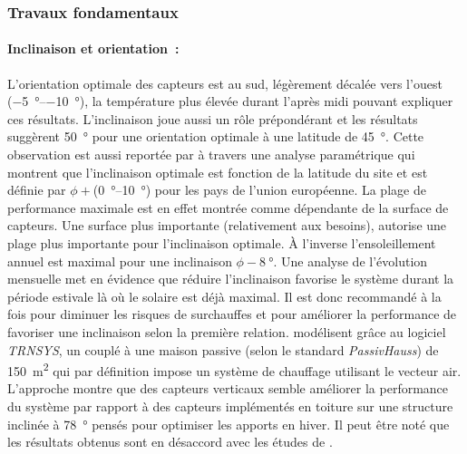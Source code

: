 \subsubsection{Travaux fondamentaux} %
\label{ssub:travaux_fondamentaux}
\paragraph{Inclinaison et orientation~:} %
\label{par:inclinaison_et_orientation}
L’orientation optimale des capteurs est au sud, légèrement décalée vers
l’ouest (\SIrange{-5}{-10}{\degree}), la température plus élevée durant l’après midi pouvant
expliquer ces résultats.
L’inclinaison joue aussi un rôle prépondérant et les résultats suggèrent \SI{50}{\degree}
pour une orientation optimale à une latitude de \SI{45}{\degree}. Cette observation est
aussi reportée par \textcite{Shariah2002587} à travers une analyse paramétrique qui montrent
que l’inclinaison optimale est fonction de la latitude du site et est définie par
$\phi + $(\SIrange{0}{10}{\degree}) pour les pays de l’union européenne. La plage de performance
maximale est en effet montrée comme dépendante de la surface de capteurs.
Une surface plus importante (relativement aux besoins), autorise une plage plus importante
pour l’inclinaison optimale. À l’inverse l’ensoleillement annuel est maximal pour
une inclinaison $\phi - \SI{8}{\degree}$. Une analyse de l’évolution mensuelle met
en évidence que réduire l’inclinaison favorise le système durant la période estivale
là où le solaire est déjà maximal. Il est donc recommandé à la fois pour diminuer
les risques de surchauffes et pour améliorer la performance de favoriser une
inclinaison selon la première relation.
\textcite{Badescu2006129} modélisent grâce au logiciel \textit{TRNSYS}, un 
couplé à une maison passive (selon le standard \textit{PassivHauss}) de \SI{150}{\metre\squared}
qui par définition impose un système de chauffage utilisant le vecteur air. L’approche montre que des
capteurs verticaux semble améliorer la performance du système par rapport à des
capteurs implémentés en toiture sur une structure inclinée à \SI{78}{\degree} pensés pour optimiser les apports
en hiver. Il peut être noté que les résultats obtenus sont en désaccord avec les études
de \textcite{Task26C2007,Shariah2002587}.


